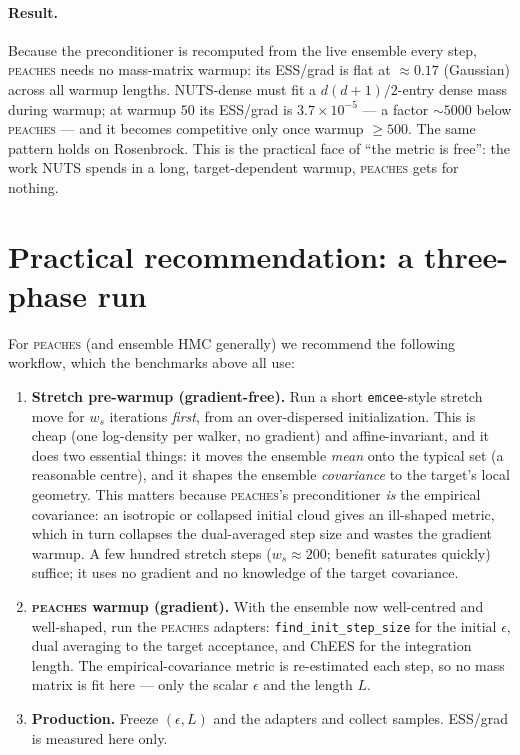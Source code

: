 \documentclass[11pt]{article}
\begin{document}
\paragraph{Result.} Because the preconditioner is recomputed from the live
ensemble every step, \textsc{peaches} needs no mass-matrix warmup: its ESS/grad
is flat at $\approx\!0.17$ (Gaussian) across all warmup lengths. NUTS-dense must
fit a $d(d{+}1)/2$-entry dense mass during warmup; at warmup $50$ its ESS/grad
is $3.7\times10^{-5}$ --- a factor $\sim\!5000$ below \textsc{peaches} --- and
it becomes competitive only once warmup $\ge\!500$. The same pattern holds on
Rosenbrock. This is the practical face of ``the metric is free'': the work NUTS
spends in a long, target-dependent warmup, \textsc{peaches} gets for nothing.

\section{Practical recommendation: a three-phase run}\label{sec:rec}

For \textsc{peaches} (and ensemble HMC generally) we recommend the following
workflow, which the benchmarks above all use:

\begin{enumerate}
\item[\textbf{1.}] \textbf{Stretch pre-warmup (gradient-free).} Run a short
\texttt{emcee}-style stretch move for $w_s$ iterations \emph{first}, from an
over-dispersed initialization. This is cheap (one log-density per walker, no
gradient) and affine-invariant, and it does two essential things: it moves the
ensemble \emph{mean} onto the typical set (a reasonable centre), and it shapes
the ensemble \emph{covariance} to the target's local geometry. This matters
because \textsc{peaches}'s preconditioner \emph{is} the empirical covariance: an
isotropic or collapsed initial cloud gives an ill-shaped metric, which in turn
collapses the dual-averaged step size and wastes the gradient warmup. A few
hundred stretch steps ($w_s\!\approx\!200$; benefit saturates quickly) suffice;
it uses no gradient and no knowledge of the target covariance.
\item[\textbf{2.}] \textbf{\textsc{peaches} warmup (gradient).} With the
ensemble now well-centred and well-shaped, run the \textsc{peaches} adapters:
\texttt{find\_init\_step\_size} for the initial $\epsilon$, dual averaging to the
target acceptance, and ChEES for the integration length. The
empirical-covariance metric is re-estimated each step, so no mass matrix is fit
here --- only the scalar $\epsilon$ and the length $L$.
\item[\textbf{3.}] \textbf{Production.} Freeze $(\epsilon,L)$ and the adapters
and collect samples. ESS/grad is measured here only.
\end{enumerate}
\end{document}
